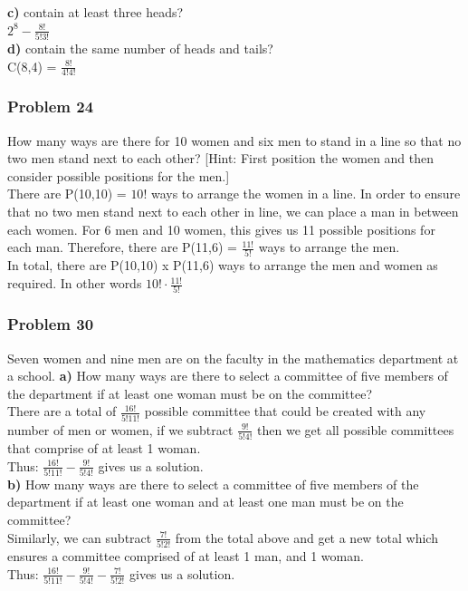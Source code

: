 \documentclass[paper=a4, fontsize=11pt]{scrartcl} %
\begin{document}
\textbf{c)} contain at least three heads?\\
$2^8 - \frac{8!}{5!3!}$\\

\textbf{d)} contain the same number of heads and tails?\\
C(8,4) = $\frac{8!}{4!4!}$\\

\subsubsection*{Problem 24}
How many ways are there for 10 women and six men to stand in a line so that no two men stand next to each other? [Hint: First position the women and then consider possible positions for the men.]\\

There are P(10,10) = $10!$ ways to arrange the women in a line. In order to ensure that no two men stand next to each other in line, we can place a man in between each women. For 6 men and 10 women, this gives us 11 possible positions for each man. Therefore, there are P(11,6) = $\frac{11!}{5!}$ ways to arrange the men.\\

In total, there are P(10,10) x P(11,6) ways to arrange the men and women as required. In other words $10!\cdot\frac{11!}{5!}$ \\

\subsubsection*{Problem 30}
Seven women and nine men are on the faculty in the mathematics department at a school.
\textbf{a)} How many ways are there to select a committee of five members of the department if at least one woman must be on the committee?\\
There are a total of $\frac{16!}{5!11!}$ possible committee that could be created with any number of men or women, if we subtract $\frac{9!}{5!4!}$ then we get all possible committees that comprise of at least 1 woman.\\

Thus: $\frac{16!}{5!11!} - \frac{9!}{5!4!}$ gives us a solution.\\

\textbf{b)} How many ways are there to select a committee of five members of the department if at least one woman and at least one man must be on the committee?\\
Similarly, we can subtract $\frac{7!}{5!2!}$ from the total above and get a new total which ensures a committee comprised of at least 1 man, and 1 woman.\\

Thus: $\frac{16!}{5!11!} - \frac{9!}{5!4!} -\frac{7!}{5!2!}$ gives us a solution.
\end{document}

